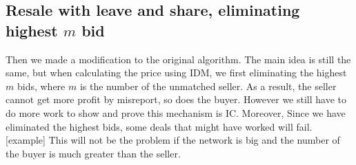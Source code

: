 \subsection*{Resale with leave and share, eliminating highest \(m\) bid}
Then we made a modification to the original algorithm. The main idea is still the same, but when calculating
the price using IDM, we first eliminating the highest \(m\) bids, where \(m\) is the number of the unmatched seller.
As a result, the seller cannot get more profit by misreport, so does the buyer. However we still have to do
more work to show and prove this mechanism is IC.
Moreover, Since we have eliminated the highest bids, some deals that might have worked will fail. [example]
This will not be the problem if the network is big and the number of the buyer is much greater than the seller.